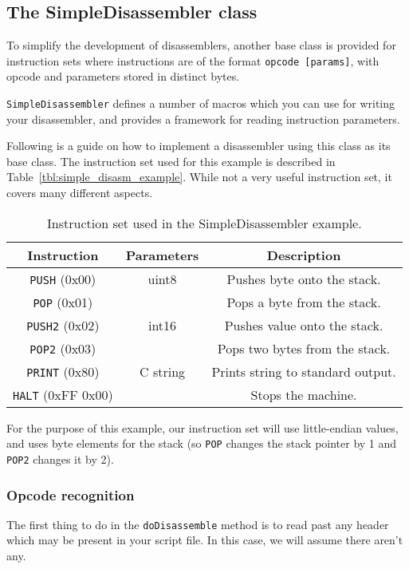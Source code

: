 \subsection{The SimpleDisassembler class}
To simplify the development of disassemblers, another base class is provided for instruction sets where instructions are of the format \verb+opcode [params]+, with opcode and parameters stored in distinct bytes.

\verb+SimpleDisassembler+ defines a number of macros which you can use for writing your disassembler, and provides a framework for reading instruction parameters.

Following is a guide on how to implement a disassembler using this class as its base class. The instruction set used for this example is described in Table~\vref{tbl:simple_disasm_example}. While not a very useful instruction set, it covers many different aspects.

\begin{table}[!hpbt]
\centering
\begin{tabular}{c | c | c}
Instruction & Parameters & Description \\
\hline
\verb+PUSH+ (0x00) & uint8 & Pushes byte onto the stack.\\
\verb+POP+ (0x01) & &  Pops a byte from the stack. \\
\verb+PUSH2+ (0x02) & int16 & Pushes value onto the stack.\\
\verb+POP2+ (0x03) & &  Pops two bytes from the stack. \\
\verb+PRINT+ (0x80) & C string & Prints string to standard output. \\
\verb+HALT+ (0xFF 0x00) & & Stops the machine.
\end{tabular}
\caption{Instruction set used in the SimpleDisassembler example.}
\label{tbl:simple_disasm_example}
\end{table}

For the purpose of this example, our instruction set will use little-endian values, and uses byte elements for the stack (so \verb+POP+ changes the stack pointer by 1 and \verb+POP2+ changes it by 2).

\subsubsection{Opcode recognition}
The first thing to do in the \verb+doDisassemble+ method is to read past any header which may be present in your script file. In this case, we will assume there aren't any.

